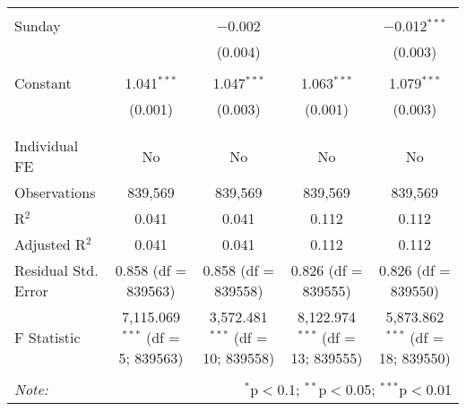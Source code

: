 \documentclass[
]{article}
\begin{document}
\begin{table}[!htbp]
{\begin{tabular}{@{\extracolsep{5pt}}lcccc}
  & & & & \\ 
 Sunday &  & $-$0.002 &  & $-$0.012$^{***}$ \\ 
  &  & (0.004) &  & (0.003) \\ 
  & & & & \\ 
 Constant & 1.041$^{***}$ & 1.047$^{***}$ & 1.063$^{***}$ & 1.079$^{***}$ \\ 
  & (0.001) & (0.003) & (0.001) & (0.003) \\ 
  & & & & \\ 
\hline \\[-1.8ex] 
Individual FE & No & No & No & No \\ 
Observations & 839,569 & 839,569 & 839,569 & 839,569 \\ 
R$^{2}$ & 0.041 & 0.041 & 0.112 & 0.112 \\ 
Adjusted R$^{2}$ & 0.041 & 0.041 & 0.112 & 0.112 \\ 
Residual Std. Error & 0.858 (df = 839563) & 0.858 (df = 839558) & 0.826 (df = 839555) & 0.826 (df = 839550) \\ 
F Statistic & 7,115.069$^{***}$ (df = 5; 839563) & 3,572.481$^{***}$ (df = 10; 839558) & 8,122.974$^{***}$ (df = 13; 839555) & 5,873.862$^{***}$ (df = 18; 839550) \\ 
\hline 
\hline \\[-1.8ex] 
\textit{Note:}  & \multicolumn{4}{r}{$^{*}$p$<$0.1; $^{**}$p$<$0.05; $^{***}$p$<$0.01} \\ 
\end{tabular}
} 
\end{table} 
\newpage
\end{document}
